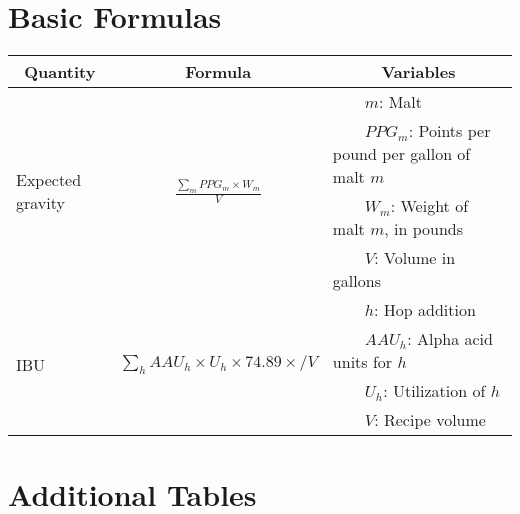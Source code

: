 \documentclass{article}
\newcommand{\tabitem}{~~\llap{\textbullet}~~}
\begin{document}
\section*{Basic Formulas}


\begin{tabular}{l|c|l}
	\multicolumn{1}{c|}{Quantity} & Formula & \multicolumn{1}{|c}{Variables}\\ \hline
	\multirow{4}{*}{Expected gravity} & \multirow{4}{*}{$\frac{\sum_{m} PPG_m\times W_m}{V}$} & \tabitem $m$: Malt\\
	& & \tabitem $PPG_m$: Points per pound per gallon of malt $m$\\
	& & \tabitem $W_m$: Weight of malt $m$, in pounds\\
	& & \tabitem $V$: Volume in gallons\\ \hline
	\multirow{4}{*}{IBU} & \multirow{4}{*}{$\sum_h AAU_h\times U_h\times 74.89\times / V$} & \tabitem $h$: Hop addition\\
	& & \tabitem $AAU_h$: Alpha acid units for $h$\\
	& & \tabitem $U_h$: Utilization of $h$\\
	& & \tabitem $V$: Recipe volume\\
	\hline\hline
\end{tabular}

\section*{Additional Tables}
\end{document}
